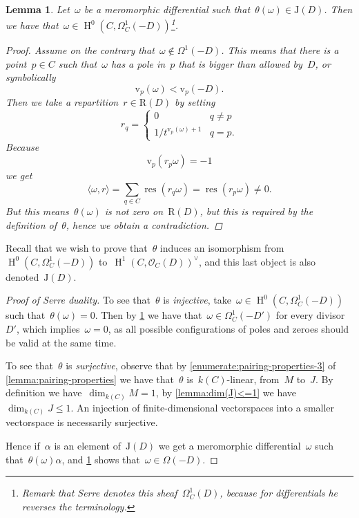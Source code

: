 \documentclass[10pt,a4paper]{article}
\theoremstyle{lecture}
\newtheorem{lemma}[theorem]{Lemma}
\newcommand\dash{\nobreakdash-\hspace{0pt}}
\DeclareMathOperator\HH{H}
\DeclareMathOperator\res{res}
\begin{document}
\begin{lemma}
  \label{lemma:theta-J(D)}
  Let~$\omega$ be a meromorphic differential such that~$\theta(\omega)\in\mathrm{J}(D)$. Then we have that~$\omega\in\HH^0(C,\Omega_C^1(-D))$\footnote{Remark that Serre denotes this sheaf~$\Omega_C^1(D)$, because for differentials he reverses the terminology.}.

  \begin{proof}
    Assume on the contrary that~$\omega\notin\Omega^1(-D)$. This means that there is a point~$p\in C$ such that~$\omega$ has a pole in~$p$ that is bigger than allowed by~$D$, or symbolically
    \begin{equation}
      \mathrm{v}_p(\omega)<\mathrm{v}_p(-D).
    \end{equation}
    Then we take a repartition~$r\in\mathrm{R}(D)$ by setting
    \begin{equation}
      r_q=
      \begin{cases}
        0 & q\neq p \\
        1/t^{\mathrm{v}_p(\omega)+1} & q=p.
      \end{cases}
    \end{equation}
    Because
    \begin{equation}
      \mathrm{v}_p(r_p\omega)=-1
    \end{equation}
    we get
    \begin{equation}
      \langle\omega,r\rangle=\sum_{q\in C}\res(r_q\omega)=\res(r_p\omega)\neq 0.
    \end{equation}
    But this means~$\theta(\omega)$ is not zero on~$\mathrm{R}(D)$, but this is required by the definition of~$\theta$, hence we obtain a contradiction.
  \end{proof}
\end{lemma}

Recall that we wish to prove that~$\theta$ induces an isomorphism from~$\HH^0(C,\Omega_C^1(-D))$ to~$\HH^1(C,\mathcal{O}_C(D))^\vee$, and this last object is also denoted~$\mathrm{J}(D)$.
\begin{proof}[Proof of Serre duality]
  To see that~$\theta$ is \emph{injective}, take~$\omega\in\HH^0(C,\Omega_C^1(-D))$ such that~$\theta(\omega)=0$. Then by \cref{lemma:theta-J(D)} we have that~$\omega\in\Omega_C^1(-D')$ for every divisor~$D'$, which implies~$\omega=0$, as all possible configurations of poles and zeroes should be valid at the same time.

  To see that~$\theta$ is \emph{surjective}, observe that by \cref{enumerate:pairing-properties-3} of \cref{lemma:pairing-properties} we have that~$\theta$ is~$k(C)$\dash linear, from~$M$ to~$J$. By definition we have~$\dim_{k(C)}M=1$, by \cref{lemma:dim(J)<=1} we have~$\dim_{k(C)}J\leq 1$. An injection of finite-dimensional vectorspaces into a smaller vectorspace is necessarily surjective.

  Hence if~$\alpha$ is an element of~$\mathrm{J}(D)$ we get a meromorphic differential~$\omega$ such that~$\theta(\omega)\alpha$, and \cref{lemma:theta-J(D)} shows that~$\omega\in\Omega(-D)$.
\end{proof}
\end{document}
